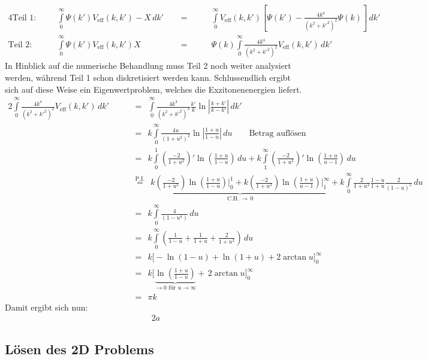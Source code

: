 \begin{alignat*}{4}
\text{Teil 1:}\qquad 	&&  \int\limits_{0}^{\infty} \Psi(k ')V_\text{eff}(k,k')-X \,dk' && \ \ = \ \ &&
											&\int\limits_{0}^{\infty} V_\text{eff}(k,k')\left [\Psi(k ')-\frac{4k^4}{(k^2+k '^2)^2}\Psi(k)\right ]\,dk'  \\ 
\text{Teil 2:}\qquad 	&& 	\int\limits_{0}^{\infty} \Psi(k ')V_\text{eff}(k,k')X   && \ \ = \ \ &&
											&\Psi(k)\int\limits_{0}^{\infty} \frac{4k^4}{(k^2+k '^2)^2}V_\text{eff}(k,k')\,dk'
\end{alignat*}
In Hinblick auf die numerische Behandlung muss Teil 2 noch weiter analysiert werden, während Teil 1 schon diskretisiert werden kann. Schlussendlich ergibt sich auf diese Weise ein Eigenwertproblem, welches die Exzitonenenergien liefert. 
\begin{alignat*}{2}
\int\limits_{0}^{\infty} \frac{4k^4}{(k^2+k '^2)^2}V_\text{eff}(k,k')\,dk' 
						&& \ \ &=\ \ \int\limits_{0}^{\infty} \frac{4k^4}{(k^2+k '^2)^2}\frac{k '}{k}\ln{\left |\frac{k + k '}{k-k'}\right |}\,dk' \\
						&& \ \ &=\ \ 	k\int\limits_{0}^{\infty} \frac{4u}{(1+u^2)^2}\ln{\left |\frac{1 + u}{1-u}\right |}\,du \qquad\text{Betrag auflösen}\\
						&& \ \ &=\ \ 	k\int\limits_{0}^{1} \left (\frac{-2}{1+u^2}\right )'\ln{\left (\frac{1 + u}{1-u}\right )}\,du + k\int\limits_{1}^{\infty} \left( \frac{-2}{1+u^2}\right )'\ln{\left (\frac{1 + u}{u-1}\right )}\,du\\
						&& \ \ &\stackrel{\text{P.I.}}{=}\ \ \underbrace{k\left (\frac{-2}{1+u^2}\right )\ln{\left ( \frac{1 + u}{1-u}\right )}\Big |_{0}^{1}+k\left (\frac{-2}{1+u^2}\right )\ln{\left ( \frac{1 + u}{u-1}\right )}\Big |_{1}^{\infty}}_{\text{C.H.}\,\rightarrow \,0}
						+k\int\limits_{0}^{\infty} \frac{2}{1+u^2}\frac{1 - u}{1+u}\frac{2}{(1-u)^2}\,du \\
						&& \ \ &=\ \ 	k\int\limits_{0}^{\infty} \frac{4}{(1-u^4)}\,du  \\
						&& \ \ &=\ \ 	k\int\limits_{0}^{\infty} \left (\frac{1}{1-u}+\frac{1}{1+u}+\frac{2}{1+u^2}\right )\,du\\
						&& \ \ &=\ \ 	k\Big[-\ln{(1-u)}+\ln{(1+u)}+ 2\arctan{u}\Big]_{0}^{\infty}\\  
						&& \ \ &=\ \ 	k\Big[\underbrace{\ln\left (\frac{1+u}{1-u}\right )}_{\rightarrow 0 \text{ für } u\rightarrow \infty}+\, 2\arctan{u}\Big]_{0}^{\infty}\\  
						&& \ \ &=\ \ 	\pi k
\end{alignat*}
Damit ergibt sich nun: 
\begin{alignat*}{2}
a
\end{alignat*}
\subsection{Lösen des 2D Problems}
